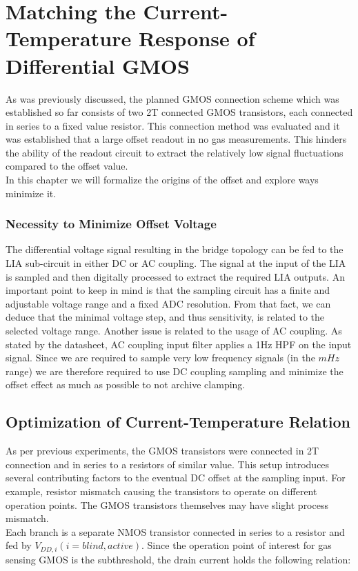 \section{Matching the Current-Temperature Response of Differential GMOS}
As was previously discussed, the planned GMOS connection scheme which was
established so far consists of two 2T connected GMOS transistors, each connected
in series to a fixed value resistor. This connection method was evaluated and
it was established that a large offset readout in no gas measurements. This
hinders the ability of the readout circuit to extract the
relatively low signal fluctuations compared to the offset value. \\
In this chapter we will formalize the origins of the offset and explore ways
minimize it.

\subsubsection{Necessity to Minimize Offset Voltage}
The differential voltage signal resulting in the bridge topology can be fed
to the LIA sub-circuit in either DC or AC coupling. The signal at the input
of the LIA is sampled and then digitally processed to extract the required
LIA outputs. An important point to keep in mind is that the sampling circuit
has a finite and adjustable voltage range and a fixed ADC resolution. From
that fact, we can deduce that the minimal voltage step, and thus
sensitivity, is related to the selected voltage range. Another issue is
related to the usage of AC coupling. As stated by the datasheet, AC coupling
input filter applies a 1Hz HPF on the input signal. Since we are required to
sample very low frequency signals (in the $mHz$ range) we are therefore
required to use DC coupling sampling and minimize the offset effect as much
as possible to not archive clamping.

\subsection{Optimization of Current-Temperature Relation}
As per previous experiments, the GMOS transistors were connected in 2T
connection and in series to a resistors of similar value. This setup
introduces several contributing factors to the eventual DC offset at the
sampling input. For example, resistor mismatch causing the transistors to
operate on different operation points. The GMOS transistors themselves may
have slight process mismatch. \\
Each branch is a separate NMOS transistor connected in series to a resistor and fed by $V_{DD, i}(i=blind, active)$. Since the operation point of interest for gas sensing GMOS is the subthreshold, the drain current holds the following relation:

